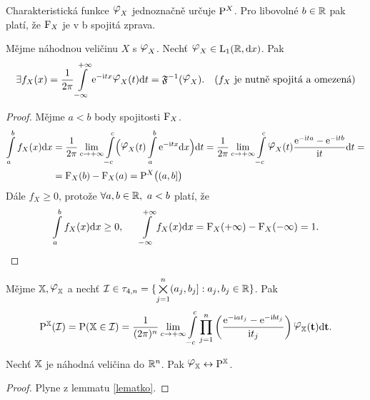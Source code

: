 \begin{dusl}
	Charakteristická funkce $\lphi_X$ jednoznačně určuje $\mathrm{P}^X$. Pro libovolné $b\in\mathbb{R}$ pak platí, že $\mathrm{F}_X$ je v b spojitá zprava.
\end{dusl}
\begin{theorem}
	Mějme náhodnou veličinu $X$ s $\lphi_X$. Nechť $\lphi_X\in \L_1(\R,\dif x)$. Pak $$\exists f_X(x)=\frac{1}{2\pi}\int\limits_{-\infty}^{+\infty}\me^{-\mi tx}\lphi_X(t)\dif t=\mathfrak{F}^{-1}(\lphi_X).~~~(f_X\text{ je nutně spojitá a omezená})$$
	\begin{proof}
		Mějme $a<b$ body spojitosti $\mathrm{F}_X$.
		\[
		\begin{split}
		\int\limits_{a}^b f_X(x)\dif x&=\frac{1}{2\pi}\lim\limits_{ c\to +\infty}\int\limits_{-c}^c\Br{\lphi_X(t)\int\limits_{a}^b \me^{-\mi tx}\dif x}\dif t=\frac{1}{2\pi}\lim\limits_{ c\to +\infty}\int\limits_{-c}^c \lphi_X(t)\frac{\me^{-\mi ta}-\me^{-\mi tb}}{\mi t}\dif t= \\ &=\FF_X(b)-\FF_X(a)=\PP^X\br{(a,b]}
		\end{split}
		\] 
		Dále $f_X\geq 0$, protože $\forall a,b \in\mathbb{R}, ~a<b$ platí, že 
		$$\int\limits_{a}^b f_X(x)\mathrm{d} x\geq 0,~~~~~\int\limits_{-\infty}^{+\infty}f_X(x)\mathrm{d} x=\mathrm{F}_X(+\infty)-\mathrm{F}_X(-\infty)=1.$$
	\end{proof}
\end{theorem}
\begin{lemma}\label{lematko}
	Mějme $\X,\lphi_\X$ a nechť $\mathcal{I}\in\tau_{4,n}=\{ \bigtimes\limits_{j=1}^n (a_j,b_j]:a_j,b_j\in\mathbb{R} \}$. Pak $$ \PEX(\I)=\PP(\X\in \I)=\frac{1}{(2\pi)^n}\lim\limits_{ c\to +\infty}\int\limits_{-c}^c\prod\limits_{j=1}^n\left( \frac{\me^{-\mi at_j}-\me^{-\mi bt_j}}{\mi t_j} \right)\lphi_\X(\textbf{t})\dif\textbf{t}. $$
\end{lemma}
\begin{theorem}
	Nechť $\mathbb{X}$ je náhodná veličina do $\mathbb{R}^n$. Pak $\lphi_\X \leftrightarrow \PEX$.\begin{proof}
		Plyne z lemmatu \ref{lematko}.
	\end{proof}
\end{theorem}
